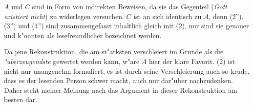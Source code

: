 \documentclass[a4paper]{article}
\begin{document}
$A$ und $C$ sind in Form von indirekten Beweisen, da sie das Gegenteil (\emph{Gott existiert nicht}) zu widerlegen versuchen. $C$ ist an sich identisch zu $A$, denn (2''), (3'') und (4'') sind zusammengefasst inhaltlich gleich mit (2), nur sind sie genauer und k"onnten als lesefreundlicher bezeichnet werden. 

Da jene Rekonstruktion, die am st"arksten verschleiert im Grunde als die \emph{"uberzeugendste} gewertet werden kann, w"are $A$ hier der klare Favorit. (2) ist nicht nur unangenehm formuliert, es ist durch seine Verschleierung auch so krude, dass es der lesenden Person schwer macht, auch nur dar"uber nachzudenken. Daher steht meiner Meinung nach das Argument in dieser Rekonstruktion am besten dar. 
\end{document}
